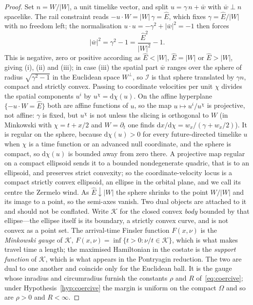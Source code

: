 \documentclass[12pt]{iopart}
\newcommand{\Ehat}{\hat E}
\newcommand{\dd}{\mathrm{d}}
\theoremstyle{plain}
\theoremstyle{definition}
\theoremstyle{plain}
\theoremstyle{remark}
\begin{document}
\begin{proof}
Set $n=W/|W|$, a unit timelike vector, and split $u=\gamma\,n+\bar w$ with
$\bar w\perp n$ spacelike. The rail constraint reads $-u\cdot W=|W|\,\gamma=\Ehat$, which
fixes $\gamma=\Ehat/|W|$ with no freedom left; the normalisation
$u\cdot u=-\gamma^2+|\bar w|^2=-1$ then forces
\[
   |\bar w|^{2}=\gamma^{2}-1=\frac{\Ehat^{2}}{|W|^{2}}-1 .
\]
This is negative, zero or positive according as $\Ehat<|W|$, $\Ehat=|W|$ or $\Ehat>|W|$,
giving (i), (ii) and (iii); in case (iii) the spatial part $\bar w$ ranges over the sphere
of radius $\sqrt{\gamma^2-1}$ in the Euclidean space $W^\perp$, so $\mathcal I$ is that sphere
translated by $\gamma n$, compact and strictly convex.
Passing to coordinate velocities per unit $\chi$ divides the spatial components $u^i$ by
$u^\chi=\dd\chi(u)$. On the affine hyperplane $\{-u\cdot W=\Ehat\}$ both are affine functions
of $u$, so the map $u\mapsto u^i/u^\chi$ is projective, not affine: $\gamma$ is fixed, but
$u^\chi$ is not unless the slicing is orthogonal to $W$ (in Minkowski with
$\chi=t+x/2$ and $W=\partial_t$ one finds $\dd x/\dd\chi=w_x/(\gamma+w_x/2)$). It is
regular on the sphere, because $\dd\chi(u)>0$ for every future-directed timelike $u$ when
$\chi$ is a time function or an advanced null coordinate, and the sphere is compact, so
$\dd\chi(u)$ is bounded away from zero there. A projective map regular on a compact
ellipsoid sends it to a bounded nondegenerate quadric, that is to an ellipsoid, and
preserves strict convexity; so the coordinate-velocity locus is a compact strictly convex
ellipsoid, an ellipse in the orbital plane, and we call its centre the Zermelo wind. As $\Ehat\downarrow|W|$ the sphere shrinks to the point $W/|W|$ and its image to a point,
so the semi-axes vanish. Two dual objects are attached to it and should not be conflated.
Write $\mathcal K$ for the closed convex \emph{body} bounded by that ellipse---the
ellipse itself is its boundary, a strictly convex curve, and is not convex as a point
set. The arrival-time Finsler function $F(x,\nu)$ is the \emph{Minkowski gauge} of
$\mathcal K$, $F(x,\nu)=\inf\{t>0:\nu/t\in\mathcal K\}$, which is what makes travel
time a length; the maximised Hamiltonian in the costate is the \emph{support function}
of $\mathcal K$, which is what appears in the Pontryagin reduction. The two are
dual to one another and coincide only for the Euclidean ball. It is the gauge whose
inradius and circumradius furnish the constants
$\rho$ and $R$ of~\eqref{eq:coercive}; under Hypothesis~\ref{hyp:coercive} the margin is
uniform on the compact $\Omega$ and so are $\rho>0$ and $R<\infty$.
\end{proof}
\end{document}
